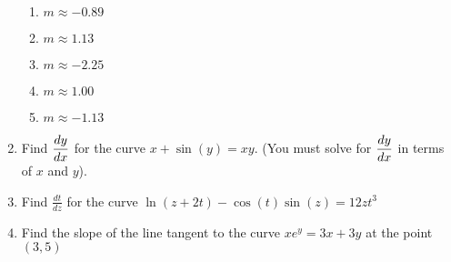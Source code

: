\documentclass[12pt]{report}
\begin{document}
\begin{enumerate}
\begin{enumerate}
\item $m\approx -0.89$

\item $m\approx 1.13$

\item $m\approx -2.25$

\item $m\approx 1.00$

\item $m\approx -1.13$

\end{enumerate}

\item Find $\displaystyle \frac{dy}{dx}$ for the curve $x + \sin(y) = xy$. (You must solve for $\displaystyle \frac{dy}{dx}$ in terms of $x$ and $y$).

\item Find $\frac{dt}{dz}$ for the curve $\ln(z+2t)-\cos(t)\sin(z)=12zt^3$

\item Find the slope of the line tangent to the curve $xe^{y}=3x+3y$ at the point $(3,5)$

\end{enumerate}
\end{document}
